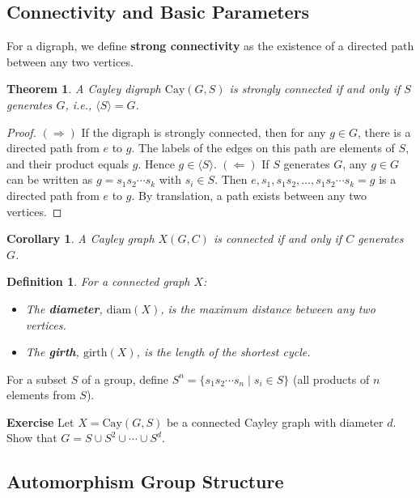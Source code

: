 \documentclass[12pt,a4paper,openany]{book}
\newtheorem{theorem}{Theorem}[section]
\newtheorem{definition}{Definition}[section]
\newtheorem{corollary}{Corollary}[section]
\begin{document}
\subsection{Connectivity and Basic Parameters}

For a digraph, we define \textbf{strong connectivity} as the existence of a directed path between any two vertices.

\begin{theorem}\label{thm:cayley-connectivity}
A Cayley digraph $\mathrm{Cay}(G, S)$ is strongly connected if and only if $S$ generates $G$, i.e., $\langle S \rangle = G$.
\end{theorem}
\begin{proof}
$(\Rightarrow)$ If the digraph is strongly connected, then for any $g \in G$, there is a directed path from $e$ to $g$. The labels of the edges on this path are elements of $S$, and their product equals $g$. Hence $g \in \langle S \rangle$.
\newline
$(\Leftarrow)$ If $S$ generates $G$, any $g \in G$ can be written as $g = s_1 s_2 \cdots s_k$ with $s_i \in S$. Then $e, s_1, s_1s_2, \dots, s_1s_2\cdots s_k = g$ is a directed path from $e$ to $g$. By translation, a path exists between any two vertices.
\end{proof}

\begin{corollary}
A Cayley graph $X(G, C)$ is connected if and only if $C$ generates $G$.
\end{corollary}

\begin{definition}
For a connected graph $X$:
\begin{itemize}
    \item The \textbf{diameter}, $\mathrm{diam}(X)$, is the maximum distance between any two vertices.
    \item The \textbf{girth}, $\mathrm{girth}(X)$, is the length of the shortest cycle.
\end{itemize}
\end{definition}

For a subset $S$ of a group, define $S^n = \{s_1s_2\cdots s_n \mid s_i \in S\}$ (all products of $n$ elements from $S$).

\bigskip\noindent\textbf{Exercise}
Let $X = \mathrm{Cay}(G,S)$ be a connected Cayley graph with diameter $d$. Show that $G = S \cup S^2 \cup \cdots \cup S^d$.


\subsection{Automorphism Group Structure}
\end{document}
